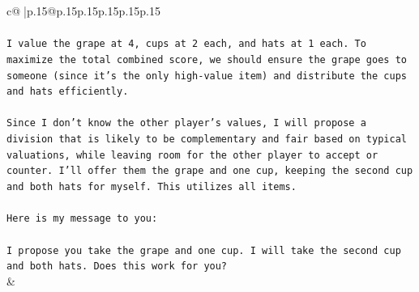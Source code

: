 \documentclass{article}
\begin{document}
{\begin{supertabular}{c@{$\;$}|p{.15\linewidth}@{}p{.15\linewidth}p{.15\linewidth}p{.15\linewidth}p{.15\linewidth}p{.15\linewidth}}
{{{\\ 
\\ 
\texttt{I value the grape at 4, cups at 2 each, and hats at 1 each. To maximize the total combined score, we should ensure the grape goes to someone (since it's the only high{-}value item) and distribute the cups and hats efficiently.} \\
\\ 
\texttt{Since I don't know the other player's values, I will propose a division that is likely to be complementary and fair based on typical valuations, while leaving room for the other player to accept or counter. I'll offer them the grape and one cup, keeping the second cup and both hats for myself. This utilizes all items.} \\
\\ 
\texttt{Here is my message to you:} \\
\\ 
\texttt{I propose you take the grape and one cup. I will take the second cup and both hats. Does this work for you?} \\
            }
        }
    }
    & \\ \\


\end{supertabular}}
\end{document}

